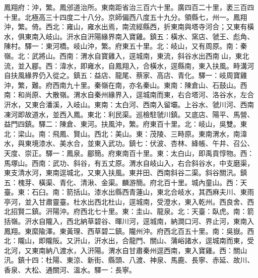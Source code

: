 \begin{pinyinscope}
鳳翔府：沖，繁。鳳邠道治所。東南距省治三百六十里。廣四百二十里，袤三百四十里。北極高三十四度二十八分。京師偏西八度五十九分。領縣七，州一。鳳翔沖，繁。倚。西北：雍山，雍水出焉，南流經縣西，折東南與塔寺河合；又東有橫水，俱東南入岐山。汧水自汧陽緣界南入寶雞。鎮五：橫水、窯店、虢王、彪角、陳村。驛一：東河橋。岐山沖，繁。府東五十里。北：岐山，又有周原。南：秦嶺。北：武將山。西南：渭水自寶雞入，逕城南，東流，斜谷水出西南山，東北流，並入郿。西：湋水，即雍水，自鳳翔入，合橫水，逕縣南，東入扶風。畤溝河自扶風緣界仍入從之。鎮五：益店、龍尾、蔡家、高店、青化。驛一：岐周寶雞沖，繁，難。府西南九十里。秦嶺在南，亦名秦山。東南：陳倉山、石鼓山。西南：和尚原、大散嶺。渭水自秦州緣界入，逕城南而東，右合塔河、洛谷水，左合汧水，又東合潘溪，入岐山。東南：太白河、西南入留壩。上谷水、虢川河、西南凍河即故道水，並西入鳳。東北：利民渠。巡檢駐虢川鎮。又底店、陽平、馬營、益門四鎮。驛二：陳倉、東河。扶風沖，繁。府東百十里。北：岐山，吳雙。東北：梁山。南：飛鳳、賢山。西北：美山。東：茂陵、三畤原。東南渭水，南湋水，與東境漆水、美水合，並東入武功。鎮七：伏波、杏林、絳帳、午井、召公、天度、崇正。驛一：鳳泉。郿簡。府東南百十里。東：太白山，即禹貢惇物。西：馬塚山。西南：武功、斜谷，有五丈原。渭水自岐山入，右合斜谷水，中支磨渠，東支清水河，東南逕城北，又東入扶風。東井田、西南斜谷二渠。斜谷關汛。鎮五：槐芽、橫渠、青化、清湫、金渠。麟游簡。府北百十里。城內童山。西：天臺。東：石臼。南：箭括山。漆水出縣西青蓮山，東北合岐水，其西麻夫川、東雨亭河，並入甘肅靈臺。杜水出西北杜山，逕城南，受澄水，東入乾州。西良舍、西北招賢二鎮。汧陽沖。府西北七十里。東：圭山、龍泉。北：天臺：臥虎。南：箭括嶺。汧水自隴入，西北納草碧谷、暉川河，逕城南，納澗口河、界止河，東南入鳳翔。東縻隃澤。東黃理、西草碧二鎮。隴州沖。府西北百五十里。南：吳嶽。西北：隴山，即隴阪。又汧山，汧水出，合龍門、關山、蒲峪諸水，逕城南而東，受北河，又東南納八渡水，入汧陽。渭水自甘肅秦州逕西南，東入寶雞。西：關山汛。鎮十四：杜陽、東涼、新街、縣頭、八渡、神泉、馬鹿、長寧、赤延、故川、香泉、大松、通關河、溫水。驛一：長寧。


\end{pinyinscope}
